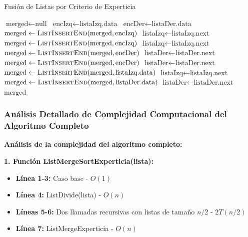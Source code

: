 \documentclass[11pt,a4paper]{article}
\begin{document}
\begin{algorithm}[H]
\caption{Fusión de Listas por Criterio de Experticia}
\begin{algorithmic}[1]
    \State $\text{merged} \leftarrow \text{null}$
        \State $\text{encIzq} \leftarrow \text{listaIzq.data}$
        \State $\text{encDer} \leftarrow \text{listaDer.data}$
            \State $\text{merged} \leftarrow \textsc{ListInsertEnd}(\text{merged}, \text{encIzq})$
            \State $\text{listaIzq} \leftarrow \text{listaIzq.next}$
             
                \State $\text{merged} \leftarrow \textsc{ListInsertEnd}(\text{merged}, \text{encIzq})$
                \State $\text{listaIzq} \leftarrow \text{listaIzq.next}$
            \Else
                \State $\text{merged} \leftarrow \textsc{ListInsertEnd}(\text{merged}, \text{encDer})$
                \State $\text{listaDer} \leftarrow \text{listaDer.next}$
            \EndIf
        \Else
            \State $\text{merged} \leftarrow \textsc{ListInsertEnd}(\text{merged}, \text{encDer})$
            \State $\text{listaDer} \leftarrow \text{listaDer.next}$
        \EndIf
    \EndWhile
     
        \State $\text{merged} \leftarrow \textsc{ListInsertEnd}(\text{merged}, \text{listaIzq.data})$
        \State $\text{listaIzq} \leftarrow \text{listaIzq.next}$
    \EndWhile
        \State $\text{merged} \leftarrow \textsc{ListInsertEnd}(\text{merged}, \text{listaDer.data})$
        \State $\text{listaDer} \leftarrow \text{listaDer.next}$
    \EndWhile
    \State \Return merged
\EndProcedure
\end{algorithmic}
\end{algorithm}

\subsubsection{Análisis Detallado de Complejidad Computacional del Algoritmo Completo}

\textbf{Análisis de la complejidad del algoritmo completo:}

\textbf{1. Función ListMergeSortExperticia(lista):}
\begin{itemize}[label=\textbullet]
\item \textbf{Línea 1-3:} Caso base - $O(1)$
\item \textbf{Línea 4:} ListDivide(lista) - $O(n)$ 
\item \textbf{Líneas 5-6:} Dos llamadas recursivas con listas de tamaño $n/2$ - $2T(n/2)$
\item \textbf{Línea 7:} ListMergeExperticia - $O(n)$
\end{itemize}
\end{document}
